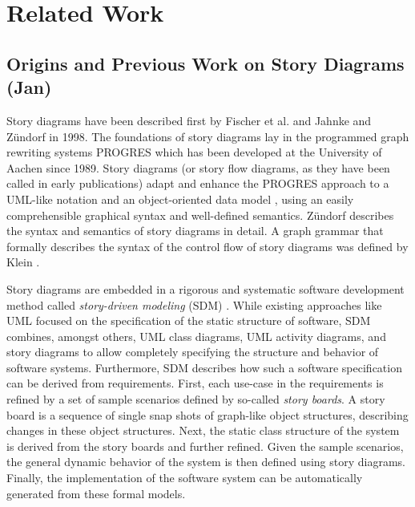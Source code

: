 \chapter{Related Work}



\section{Origins and Previous Work on Story Diagrams (Jan)}


Story diagrams have been described first by Fischer et al. \cite{FNTZ00} and Jahnke and Z\"{u}ndorf \cite{JZ98} in 1998.
The foundations of story diagrams lay in the programmed graph rewriting systems PROGRES \cite{SWZ95} which has been developed at the University of Aachen since 1989.
Story diagrams (or story flow diagrams, as they have been called in early publications) adapt and enhance the PROGRES approach to a UML-like notation and an object-oriented data model \cite{JZ98}, using an easily comprehensible graphical syntax and well-defined semantics.
Z\"{u}ndorf \cite{Zun01} describes the syntax and semantics of story diagrams in detail.
A graph grammar that formally describes the syntax of the control flow of story diagrams was defined by Klein \cite{Kle99}.

Story diagrams are embedded in a rigorous and systematic software development method called \emph{story-driven modeling} (SDM) \cite{Zun01,DGZ04}.
While existing approaches like UML focused on the specification of the static structure of software, SDM combines, amongst others, UML class diagrams, UML activity diagrams, and story diagrams to allow completely specifying the structure and behavior of software systems.
Furthermore, SDM describes how such a software specification can be derived from requirements.
First, each use-case in the requirements is refined by a set of sample scenarios defined by so-called \emph{story boards}.
A story board is a sequence of single snap shots of graph-like object structures, describing changes in these object structures.
Next, the static class structure of the system is derived from the story boards and further refined.
Given the sample scenarios, the general dynamic behavior of the system is then defined using story diagrams.
Finally, the implementation of the software system can be automatically generated from these formal models.


